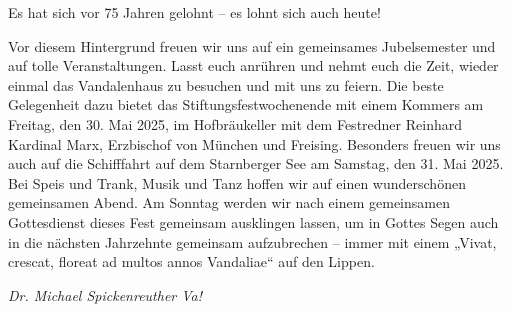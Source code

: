 \begin{multicols}{2}
Es hat sich vor 75 Jahren gelohnt – es lohnt sich auch
heute!

Vor diesem Hintergrund freuen wir uns auf ein gemeinsames
Jubelsemester und auf tolle Veranstaltungen. Lasst euch anrühren und nehmt euch
die Zeit, wieder einmal das Vandalenhaus zu besuchen und mit uns zu feiern. Die
beste Gelegenheit dazu bietet das Stiftungsfestwochenende mit einem Kommers am
Freitag, den 30. Mai 2025, im Hofbräukeller mit dem Festredner Reinhard
Kardinal Marx, Erzbischof von München und Freising. Besonders freuen wir uns
auch auf die Schifffahrt auf dem Starnberger See am Samstag, den 31. Mai 2025.
Bei Speis und Trank, Musik und Tanz hoffen wir auf einen wunderschönen
gemeinsamen Abend. Am Sonntag werden wir nach einem gemeinsamen Gottesdienst
dieses Fest gemeinsam ausklingen lassen, um in Gottes Segen auch in die
nächsten Jahrzehnte gemeinsam aufzubrechen – immer mit einem „Vivat, crescat,
floreat ad multos annos Vandaliae“ auf den Lippen.

\end{multicols}
\begin{flushright}
		\hfill\emph{Dr. Michael Spickenreuther Va!}
	\end{flushright}